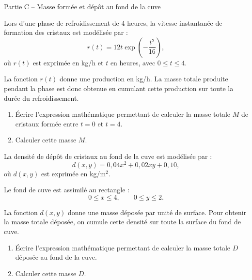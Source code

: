 \documentclass[10pt,a4paper]{article}
\begin{document}
	\begin{partbox}{Partie C -- Masse formée et dépôt au fond de la cuve}
		
		Lors d'une phase de refroidissement de 4 heures, la vitesse instantanée de formation des cristaux est modélisée par :
		\[
		r(t)=12t\exp\left(-\frac{t^2}{16}\right),
		\]
		où $r(t)$ est exprimée en kg/h et $t$ en heures, avec $0\leq t\leq 4$.
		
		\begin{databox}
			La fonction $r(t)$ donne une production en kg/h. La masse totale produite pendant la phase est donc obtenue en cumulant cette production sur toute la durée du refroidissement.
		\end{databox}
		
		\begin{enumerate}
			\item Écrire l'expression mathématique permettant de calculer la masse totale $M$ de cristaux formée entre $t=0$ et $t=4$.
			
			\item Calculer cette masse $M$.
		\end{enumerate}
		
		La densité de dépôt de cristaux au fond de la cuve est modélisée par :
		\[
		d(x,y)=0{,}04x^2+0{,}02xy+0{,}10,
		\]
		où $d(x,y)$ est exprimée en kg/m$^2$.
		
		Le fond de cuve est assimilé au rectangle :
		\[
		0\leq x\leq 4,
		\qquad
		0\leq y\leq 2.
		\]
		
		\begin{databox}
			La fonction $d(x,y)$ donne une masse déposée par unité de surface. Pour obtenir la masse totale déposée, on cumule cette densité sur toute la surface du fond de cuve.
		\end{databox}
		
		\begin{enumerate}[resume]
			\item Écrire l'expression mathématique permettant de calculer la masse totale $D$ déposée au fond de la cuve.
			
			\item Calculer cette masse $D$.
		\end{enumerate}
		
	\end{partbox}
	
\end{document}
